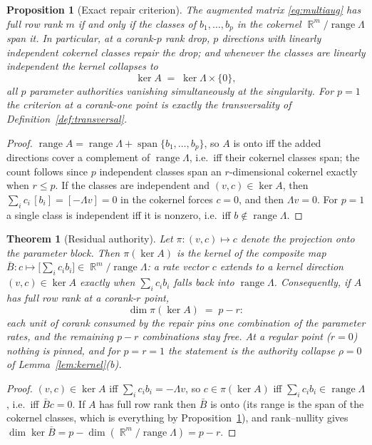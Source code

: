 \documentclass[11pt,american]{article}
\DeclareMathOperator{\R}{\mathbb{R}}
\DeclareMathOperator{\range}{range}
\newtheorem{theorem}{Theorem}
\newtheorem{proposition}{Proposition}
\theoremstyle{definition}
\theoremstyle{plain}
\theoremstyle{remark}
\begin{document}
\begin{proposition}[Exact repair criterion]\label{prop:multirepair}
The augmented matrix \eqref{eq:multiaug} has full row rank $m$ if and only if the classes of $b_1,\dots,b_p$ in the cokernel $\R^m/\range\Lambda$ span it. In particular, at a corank-$p$ rank drop, $p$ directions with linearly independent cokernel classes repair the drop; and whenever the classes are linearly independent the kernel collapses to
\[
\ker A \;=\; \ker\Lambda \times \{0\},
\]
all $p$ parameter authorities vanishing simultaneously at the singularity. For $p = 1$ the criterion at a corank-one point is exactly the transversality of Definition~\ref{def:transversal}.
\end{proposition}

\begin{proof}
$\range A = \range\Lambda + \operatorname{span}\{b_1,\dots,b_p\}$, so $A$ is onto iff the added directions cover a complement of $\range\Lambda$, i.e.\ iff their cokernel classes span; the count follows since $p$ independent classes span an $r$-dimensional cokernel exactly when $r \le p$. If the classes are independent and $(v,c) \in \ker A$, then $\sum_i c_i\,[b_i] = [-\Lambda v] = 0$ in the cokernel forces $c = 0$, and then $\Lambda v = 0$. For $p = 1$ a single class is independent iff it is nonzero, i.e.\ iff $b \notin \range\Lambda$.
\end{proof}

\begin{theorem}[Residual authority]\label{thm:residual}
Let $\pi : (v, c) \mapsto c$ denote the projection onto the parameter block. Then $\pi(\ker A)$ is the kernel of the composite map $\bar B : c \mapsto \bigl[\sum_i c_i b_i\bigr] \in \R^m/\range\Lambda$: a rate vector $c$ extends to a kernel direction $(v,c) \in \ker A$ exactly when $\sum_i c_i b_i$ falls back into $\range\Lambda$. Consequently, if $A$ has full row rank at a corank-$r$ point,
\[
\dim \pi(\ker A) \;=\; p - r :
\]
each unit of corank consumed by the repair pins one combination of the parameter rates, and the remaining $p-r$ combinations stay free. At a regular point ($r = 0$) nothing is pinned, and for $p = r = 1$ the statement is the authority collapse $\rho = 0$ of Lemma~\ref{lem:kernel}(b).
\end{theorem}

\begin{proof}
$(v,c) \in \ker A$ iff $\sum_i c_i b_i = -\Lambda v$, so $c \in \pi(\ker A)$ iff $\sum_i c_i b_i \in \range\Lambda$, i.e.\ iff $\bar B c = 0$. If $A$ has full row rank then $\bar B$ is onto (its range is the span of the cokernel classes, which is everything by Proposition~\ref{prop:multirepair}), and rank--nullity gives $\dim\ker\bar B = p - \dim(\R^m/\range\Lambda) = p - r$.
\end{proof}
\end{document}

